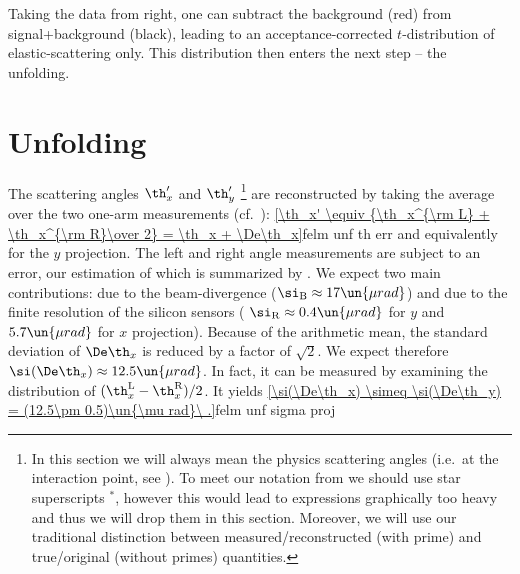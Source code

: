 
Taking the data from  right, one can subtract the background (red) from signal+background (black), leading to an acceptance-corrected $t$-distribution of elastic-scattering only. This distribution then enters the next step -- the unfolding.


\section[felm unfold]{Unfolding}

The scattering angles $\th_x'$ and $\th_y'$ \footnote{%
In this section we will always mean the physics scattering angles (i.e.~at the interaction point, see ). To meet our notation from  we should use star superscripts $^*$, however this would lead to expressions graphically too heavy and thus we will drop them in this section. Moreover, we will use our traditional distinction between measured/reconstructed (with prime) and true/original (without primes) quantities.
} are reconstructed by taking the average over the two one-arm measurements (cf.~):
\eqref{\th_x' \equiv {\th_x^{\rm L} + \th_x^{\rm R}\over 2} = \th_x + \De\th_x}{felm unf th err}
and equivalently for the $y$ projection. The left and right angle measurements are subject to an error, our estimation of which is summarized by . We expect two main contributions: due to the beam-divergence ($\si_{\rm B} \approx 17\un{\mu rad}$) and due to the finite resolution of the silicon sensors (%
$\si_{\rm R} \approx 0.4\un{\mu rad}$ for $y$ and $5.7\un{\mu rad}$ for $x$ projection). Because of the arithmetic mean, the standard deviation of $\De\th_x$ is reduced by a factor of $\sqrt 2$. We expect therefore $\si(\De\th_x) \approx 12.5\un{\mu rad}$. In fact, it can be measured by examining the distribution of $(\th_x^{\rm L} - \th_x^{\rm R})/2$. It yields
\eqref{\si(\De\th_x) \simeq \si(\De\th_y) = (12.5\pm 0.5)\un{\mu rad}\ .}{felm unf sigma proj}

